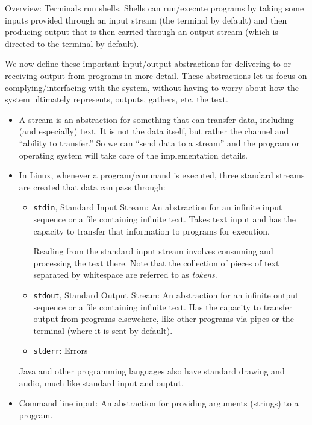\documentclass[12pt]{article}
\theoremstyle{plain}
\theoremstyle{definition}
\theoremstyle{remark}
\begin{document}
Overview:
Terminals run shells. Shells can run/execute programs by
taking some inputs provided through an input stream (the terminal by
default) and then producing output that is then carried through an
output stream (which is directed to the terminal by default).

We now define these important input/output abstractions for delivering
to or receiving output from programs in more detail.
These abstractions let us focus on complying/interfacing with the
system, without having to worry about how the system ultimately
represents, outputs, gathers, etc. the text.
\begin{itemize}
  \item A stream is an abstraction for something that can transfer data,
    including (and especially) text.
    It is not the data itself, but rather the channel and ``ability to
    transfer.''
    So we can ``send data to a stream'' and the program or operating
    system will take care of the implementation details.

  \item In Linux, whenever a program/command is executed, three standard
    streams are created that data can pass through:
    \begin{itemize}
      \item \texttt{stdin}, Standard Input Stream:
        An abstraction for an infinite input sequence or a file
        containing infinite text.
        Takes text input and has the capacity to transfer that
        information to programs for execution.

        Reading from the standard input stream involves consuming and
        processing the text there.
        Note that the collection of pieces of text separated by
        whitespace are referred to as \emph{tokens}.

      \item \texttt{stdout}, Standard Output Stream:
        An abstraction for an infinite output sequence or a file
        containing infinite text.
        Has the capacity to transfer output from programs elsewehere,
        like other programs via pipes or the terminal (where it is sent
        by default).

      \item \texttt{stderr}:
        Errors
    \end{itemize}
    Java and other programming languages also have standard drawing and
    audio, much like standard input and ouptut.

  \item Command line input:
    An abstraction for providing arguments (strings) to a program.


\end{itemize}
\end{document}
